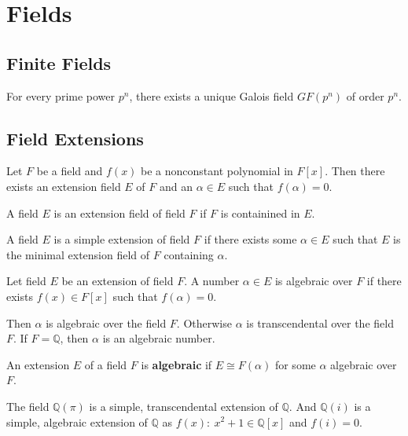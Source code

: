 \section{Fields}
\subsection{Finite Fields}
\begin{definition}
	For every prime power $p^n$, there exists a unique Galois field $GF(p^n)$ of order $p^n$.
\end{definition}

\subsection{Field Extensions}
\begin{theorem}[Kronecker]
	Let $F$ be a field and $f(x)$ be a nonconstant polynomial in $F[x]$.
	Then there exists an extension field $E$ of $F$ and an $\alpha \in E$ such that $f(\alpha) = 0$.
\end{theorem}

\begin{definition}
	A field $E$ is an extension field of field $F$ if $F$ is containined in $E$.
\end{definition}

\begin{definition}
	A field $E$ is a simple extension of field $F$ if there exists some $\alpha \in E$ such that $E$ is the minimal extension field of $F$ containing $\alpha$.
\end{definition}

\begin{definition}
	Let field $E$ be an extension of field $F$.
	A number $\alpha \in E$ is algebraic over $F$ if there exists $f(x) \in F[x]$ such that $f(\alpha) = 0$.
\end{definition}

	Then $\alpha$ is algebraic over the field $F$.
	Otherwise $\alpha$ is transcendental over the field $F$.
	If $F = \mathbb{Q}$, then $\alpha$ is an algebraic number.

\begin{definition}
	An extension $E$ of a field $F$ is \textbf{algebraic} if $E \cong F(\alpha)$ for some $\alpha$ algebraic over $F$.
\end{definition}
	The field $\mathbb{Q}(\pi)$ is a simple, transcendental extension of $\mathbb{Q}$.
	And $\mathbb{Q}(i)$ is a simple, algebraic extension of $\mathbb{Q}$ as $f(x):\ x^2+1 \in \mathbb{Q}[x]$ and $f(i) = 0$.

